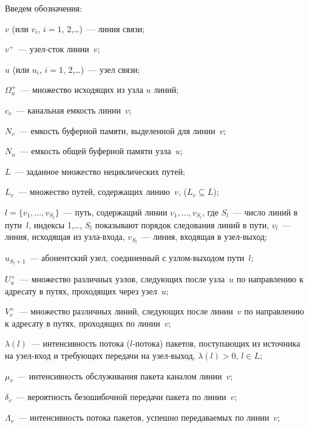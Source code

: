 \begin{multicols}{2}
     Введем обозначения:
     
     \noindent
     $v$ (или $v_i$, $i = 1$, 2,\ldots)~--- линия связи;
     
     
     \noindent
     $v^+$~--- узел-сток линии~$v$;
     
     \noindent
     $u$ (или $u_i$, $i = 1$, 2,\ldots)~--- узел связи;
     
     \noindent
     $\Omega_u^+$~--- множество исходящих из узла $u$ линий;
     
     \noindent
     $c_v$~--- канальная емкость линии~$v$;
     
     \noindent
     $N_v$~--- емкость буферной памяти, выделенной для линии~$v$;
     
     \noindent
     $N_u$~--- емкость общей буферной памяти узла~$u$;
     
     \noindent
     $L$~--- заданное множество нециклических путей;
     
     \noindent
     $L_v$~--- множество путей, содержащих линию~$v$, ($L_v\subseteq L$);
     
     \noindent
     $l=\{v_1,\ldots ,v_{S_l}\}$~--- путь, содержащий линии $v_1,\ldots 
,v_{S_l}$, где $S_l$~--- число линий в пути~$l$, индексы 1,\ldots , $S_l$ 
показывают порядок следования линий в пути, $v_l$~--- линия, исходящая из 
     узла-входа, $v_{S_l}$~--- линия, входящая в узел-выход;
     
     \noindent
     $u_{S_l+1}$~--- абонентский узел, соединенный с узлом-выходом 
пути~$l$;
     
     \noindent
     $U_u^+$~--- множество различных узлов, следующих после узла~$u$ по 
направлению к адресату в путях, проходящих через узел~$u$;
     
     \noindent
     $V_v^+$~--- множество различных линий, следующих после линии~$v$ 
по направлению к адресату в путях, проходящих по линии~$v$;
     
     \noindent
     $\lambda(l)$~--- интенсивность потока ($l$-потока) пакетов, поступающих 
из источника на узел-вход и требующих передачи на узел-выход, $\lambda(l) 
>0$, $l\in L$;
     
     \noindent
     $\mu_v$~--- интенсивность обслуживания пакета каналом линии~$v$;
     
     \noindent
     $\delta_v$~--- вероятность безошибочной передачи пакета по линии~$v$;
     
     \noindent
     $\Lambda_v$~--- интенсивность потока пакетов, успешно передаваемых 
по линии~$v$;
     

\end{multicols}
